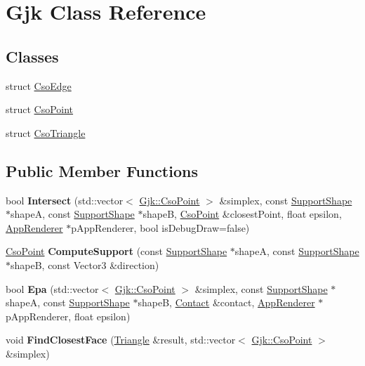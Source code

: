 \hypertarget{classGjk}{}\section{Gjk Class Reference}
\label{classGjk}
\subsection*{Classes}
\begin{DoxyCompactItemize}
\item 
struct \hyperlink{structGjk_1_1CsoEdge}{Cso\+Edge}
\item 
struct \hyperlink{structGjk_1_1CsoPoint}{Cso\+Point}
\item 
struct \hyperlink{structGjk_1_1CsoTriangle}{Cso\+Triangle}
\end{DoxyCompactItemize}
\subsection*{Public Member Functions}
\begin{DoxyCompactItemize}
\item 
\mbox{\label{classGjk_af73bc5ca3bab4249ff1fa648d8bef8fd}} 
bool {\bfseries Intersect} (std\+::vector$<$ \hyperlink{structGjk_1_1CsoPoint}{Gjk\+::\+Cso\+Point} $>$ \&simplex, const \hyperlink{classSupportShape}{Support\+Shape} $\ast$shapeA, const \hyperlink{classSupportShape}{Support\+Shape} $\ast$shapeB, \hyperlink{structGjk_1_1CsoPoint}{Cso\+Point} \&closest\+Point, float epsilon, \hyperlink{classAppRenderer}{App\+Renderer} $\ast$p\+App\+Renderer, bool is\+Debug\+Draw=false)
\item 
\mbox{\label{classGjk_a5d71f197f9410cb4fcd39f75dbf76d05}} 
\hyperlink{structGjk_1_1CsoPoint}{Cso\+Point} {\bfseries Compute\+Support} (const \hyperlink{classSupportShape}{Support\+Shape} $\ast$shapeA, const \hyperlink{classSupportShape}{Support\+Shape} $\ast$shapeB, const Vector3 \&direction)
\item 
\mbox{\label{classGjk_a6dde80e2d8016f11750cabf5072e5bd8}} 
bool {\bfseries Epa} (std\+::vector$<$ \hyperlink{structGjk_1_1CsoPoint}{Gjk\+::\+Cso\+Point} $>$ \&simplex, const \hyperlink{classSupportShape}{Support\+Shape} $\ast$shapeA, const \hyperlink{classSupportShape}{Support\+Shape} $\ast$shapeB, \hyperlink{classContact}{Contact} \&contact, \hyperlink{classAppRenderer}{App\+Renderer} $\ast$p\+App\+Renderer, float epsilon)
\item 
\mbox{\label{classGjk_ac0bc8a75db8a2dad4f23aa4a9626ba2b}} 
void {\bfseries Find\+Closest\+Face} (\hyperlink{classTriangle}{Triangle} \&result, std\+::vector$<$ \hyperlink{structGjk_1_1CsoPoint}{Gjk\+::\+Cso\+Point} $>$ \&simplex)
\end{DoxyCompactItemize}
